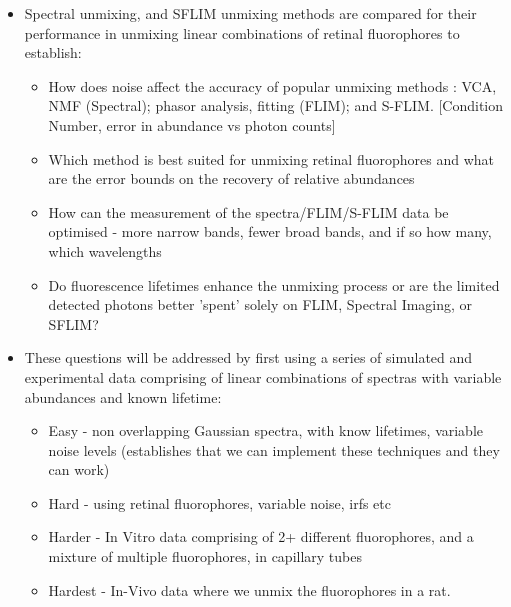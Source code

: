\documentclass{optica-article}
\begin{document}
\begin{itemize}
    \item Spectral unmixing, and SFLIM unmixing methods are compared for their performance in unmixing linear combinations of retinal fluorophores to establish:
    \begin{itemize}
        \item How does noise affect the accuracy of popular unmixing methods : VCA, NMF (Spectral); phasor analysis, fitting (FLIM); and S-FLIM. [Condition Number, error in abundance vs photon counts]
        \item Which method is best suited for unmixing retinal fluorophores and what are the error bounds on the recovery of relative abundances
        \item How can the measurement of the spectra/FLIM/S-FLIM data be optimised - more narrow bands, fewer broad bands, and if so how many, which wavelengths
        \item Do fluorescence lifetimes enhance the unmixing process or are the limited detected photons better 'spent' solely  on FLIM, Spectral Imaging, or SFLIM?
    \end{itemize}
    \item These questions will be addressed by first using a series of simulated and experimental data comprising of linear combinations of spectras with variable abundances and known lifetime:
    \begin{itemize}
        \item Easy - non overlapping Gaussian spectra, with know lifetimes, variable noise levels (establishes that we can implement these techniques and they can work)
        \item Hard - using retinal fluorophores, variable noise, irfs etc
        \item Harder - In Vitro data comprising of 2+ different fluorophores, and a mixture of multiple fluorophores, in capillary tubes
        \item Hardest - In-Vivo data where we unmix the fluorophores in a rat.
    \end{itemize}
\end{itemize}
\end{document}
